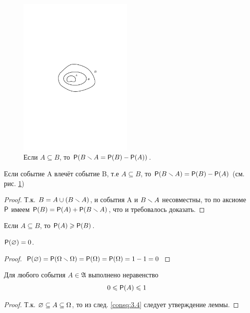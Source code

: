 \begin{figure}[h!]
	\centering
	\includegraphics[width=0.5\textwidth]{pic/pic2.pdf}
	\caption{Если $A\subseteq B$, то $\P(B\ssm A=\P(B)-\P(A))$.}
	\label{fig2}
\end{figure}
\begin{lemma}
	\label{lemma:3.3}
	Если событие A влечёт событие B, т.е $A\subseteq B$, то $\P(B\ssm A)=\P(B)-\P(A)$ (см. рис. \ref{fig2})
\end{lemma}

\begin{proof}
	Т.к. $B=A\cup(B\ssm A)$,  и события A и $B\ssm A $ несовместны, то по аксиоме $\mathfrak{\P}$ имеем $\P(B)=\P(A)+\P(B\ssm A)$, что и требовалось доказать.
\end{proof}


\begin{consq}
	\label{consq:3.4}
	Если $A\subseteq B$, то $\P(A)\geqslant \P(B)$. 
\end{consq}

\begin{lemma}
	\label{lemma:3.5}
	$\P(\noo)=0$.
\end{lemma}
\begin{proof}
	$\P(\noo)=\P(\Omega\ssm\Omega)=\P(\Omega)=\P(\Omega)=1-1=0$
\end{proof}

\begin{lemma}
	\label{lemma:3.6}
	Для любого события $A\in\mathfrak{A}$ выполнено неравенство
	\begin{equation*}
		0\leqslant \P(A)\leqslant 1
	\end{equation*}
\end{lemma}
\begin{proof}
	Т.к. $\O\subseteq A\subseteq\Omega$, то из след. \ref{consq:3.4} следует утверждение леммы. 
\end{proof}

